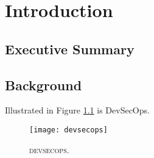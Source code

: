 \chapter{Introduction}
\section{Executive Summary}

\lipsum[1-2]

\newpage

\section{Background}


Illustrated in Figure \ref{fig:devsecops} is DevSecOps.

\begin{figure}[h]
  \centering
  \texttt{[image: devsecops]}
  \caption{\textsc{devsecops}\parencite{devsecops}.}
  \label{fig:devsecops}
\end{figure}

\lipsum[3-4]


